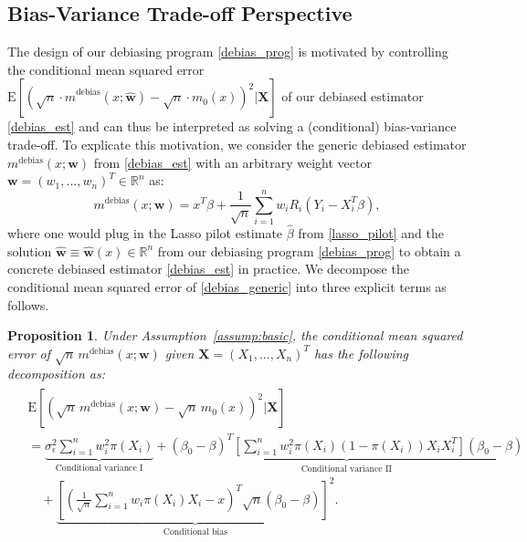 \documentclass[ejsv2,noshowframe]{imsart}
\theoremstyle{plain}
\newtheorem{proposition}[theorem]{Proposition}
\theoremstyle{definition}
\theoremstyle{remark}
\renewcommand{\hat}{\widehat}
\begin{document}
\subsection{Bias-Variance Trade-off Perspective}
\label{subsec:bias_var_interp}

The design of our debiasing program \eqref{debias_prog} is motivated by controlling the conditional mean squared error $\mathrm{E}\left[\left(\sqrt{n}\cdot \hat{m}^{\text{debias}}(x;\hat{\bm{w}}) - \sqrt{n}\cdot m_0(x) \right)^2 \big| \bm{X}\right]$
of our debiased estimator \eqref{debias_est} and can thus be interpreted as solving a (conditional) bias-variance trade-off. To explicate this motivation, we consider the generic debiased estimator $m^{\text{debias}}(x;\bm{w})$ from \eqref{debias_est} with an arbitrary weight vector $\bm{w} =(w_1,...,w_n)^T\in \mathbb{R}^n$ as:
\begin{equation}
	\label{debias_generic}
	m^{\text{debias}}(x;\bm{w}) = x^T\beta + \frac{1}{\sqrt{n}} \sum_{i=1}^n w_i R_i \left(Y_i-X_i^T \beta \right),
\end{equation}
where one would plug in the Lasso pilot estimate $\hat{\beta}$ from \eqref{lasso_pilot} and the solution $\hat{\bm{w}}\equiv \hat{\bm{w}}(x) \in \mathbb{R}^n$ from our debiasing program \eqref{debias_prog} to obtain a concrete debiased estimator \eqref{debias_est} in practice. We decompose the conditional mean squared error of \eqref{debias_generic} into three explicit terms as follows.

\begin{proposition}
	\label{prop:cond_MSE}
	Under Assumption~\ref{assump:basic}, the conditional mean squared error of $\sqrt{n}\,m^{\mathrm{debias}}(x;\bm{w})$ given $\bm{X}=(X_1,...,X_n)^T$ has the following decomposition as:
	\begin{align}
		\label{cond_MSE}
		\begin{split}
			&\mathrm{E}\left[\left(\sqrt{n}\,m^{\mathrm{debias}}(x;\bm{w}) - \sqrt{n}\, m_0(x) \right)^2 \Big| \bm{X} \right] \\
			&= \underbrace{\sigma_{\epsilon}^2\sum_{i=1}^n w_i^2 \pi(X_i)}_{\text{Conditional variance I}} + \underbrace{\left(\beta_0 - \beta\right)^T \left[\sum_{i=1}^n w_i^2\pi(X_i)\left(1-\pi(X_i)\right)X_iX_i^T \right] \left(\beta_0 - \beta\right)}_{\text{Conditional variance II}} \\
			&\quad + \underbrace{\left[\left(\frac{1}{\sqrt{n}}\sum_{i=1}^n w_i \pi(X_i) X_i -x \right)^T \sqrt{n}\left(\beta_0 - \beta\right) \right]^2}_{\text{Conditional bias}}.
		\end{split}
	\end{align}
\end{proposition}
\end{document}
